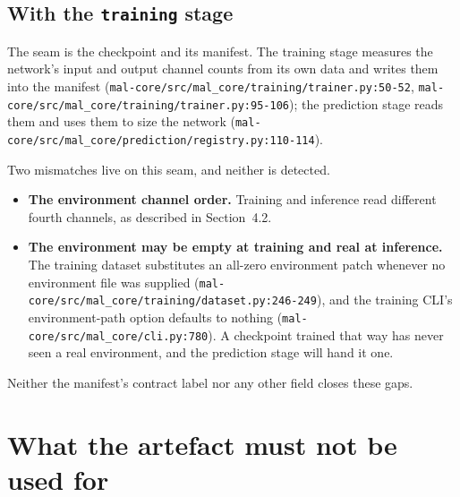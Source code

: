 \documentclass[11pt,a4paper]{article}
\newcommand{\code}[1]{\texttt{#1}}
\begin{document}
\subsection{With the \code{training} stage}

The seam is the checkpoint and its manifest. The training stage measures the
network's input and output channel counts from its own data and writes them
into the manifest
(\code{mal-core/src/mal\_core/training/trainer.py:50-52},
\code{mal-core/src/mal\_core/training/trainer.py:95-106}); the prediction
stage reads them and uses them to size the network
(\code{mal-core/src/mal\_core/prediction/registry.py:110-114}).

Two mismatches live on this seam, and neither is detected.

\begin{itemize}
\item \textbf{The environment channel order.} Training and inference read
  different fourth channels, as described in Section~4.2.
\item \textbf{The environment may be empty at training and real at
  inference.} The training dataset substitutes an all-zero environment patch
  whenever no environment file was supplied
  (\code{mal-core/src/mal\_core/training/dataset.py:246-249}), and the
  training CLI's environment-path option defaults to nothing
  (\code{mal-core/src/mal\_core/cli.py:780}). A checkpoint trained that way
  has never seen a real environment, and the prediction stage will hand it
  one.
\end{itemize}

Neither the manifest's contract label nor any other field closes these gaps.

\section{What the artefact must not be used for}
\end{document}
